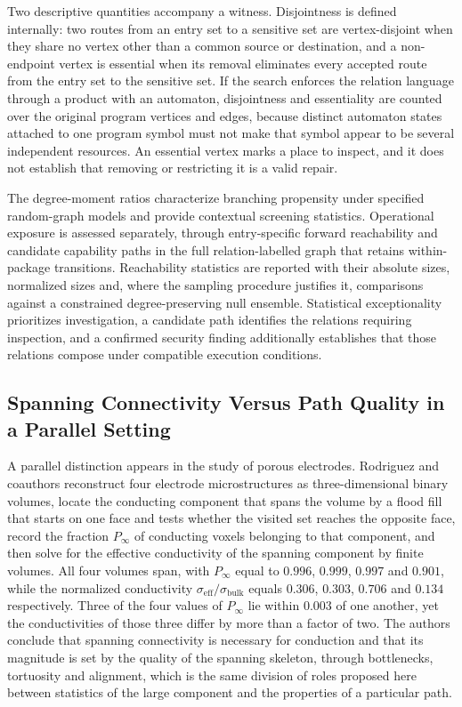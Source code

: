 \documentclass[11pt]{article}
\begin{document}
Two descriptive quantities accompany a witness. Disjointness is defined internally: two routes from an entry set to a sensitive set are vertex-disjoint when they share no vertex other than a common source or destination, and a non-endpoint vertex is essential when its removal eliminates every accepted route from the entry set to the sensitive set. If the search enforces the relation language through a product with an automaton, disjointness and essentiality are counted over the original program vertices and edges, because distinct automaton states attached to one program symbol must not make that symbol appear to be several independent resources. An essential vertex marks a place to inspect, and it does not establish that removing or restricting it is a valid repair.

The degree-moment ratios characterize branching propensity under specified random-graph models and provide contextual screening statistics. Operational exposure is assessed separately, through entry-specific forward reachability and candidate capability paths in the full relation-labelled graph that retains within-package transitions. Reachability statistics are reported with their absolute sizes, normalized sizes and, where the sampling procedure justifies it, comparisons against a constrained degree-preserving null ensemble. Statistical exceptionality prioritizes investigation, a candidate path identifies the relations requiring inspection, and a confirmed security finding additionally establishes that those relations compose under compatible execution conditions.

\subsection{Spanning Connectivity Versus Path Quality in a Parallel Setting}

A parallel distinction appears in the study of porous electrodes. Rodriguez and coauthors \cite{Rodriguez2026} reconstruct four electrode microstructures as three-dimensional binary volumes, locate the conducting component that spans the volume by a flood fill that starts on one face and tests whether the visited set reaches the opposite face, record the fraction $P_\infty$ of conducting voxels belonging to that component, and then solve for the effective conductivity of the spanning component by finite volumes. All four volumes span, with $P_\infty$ equal to $0.996$, $0.999$, $0.997$ and $0.901$, while the normalized conductivity $\sigma_{\mathrm{eff}}/\sigma_{\mathrm{bulk}}$ equals $0.306$, $0.303$, $0.706$ and $0.134$ respectively. Three of the four values of $P_\infty$ lie within $0.003$ of one another, yet the conductivities of those three differ by more than a factor of two. The authors conclude that spanning connectivity is necessary for conduction and that its magnitude is set by the quality of the spanning skeleton, through bottlenecks, tortuosity and alignment, which is the same division of roles proposed here between statistics of the large component and the properties of a particular path.
\end{document}
